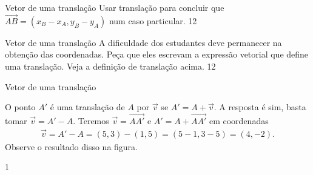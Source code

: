 \clearmargin
\begin{objectives}{Vetor de uma translação}
{
Usar translação para concluir que \(\overrightarrow{AB} = (x_B-x_A, y_B-y_A)\) num caso particular.
}{1}{2}
\end{objectives}
\begin{sugestions}{Vetor de uma translação}
{
A dificuldade dos estudantes deve permanecer na obtenção das coordenadas. Peça que eles escrevam a expressão vetorial que define uma translação. Veja a definição de translação acima.
}{1}{2}
\end{sugestions}
\begin{answer}{Vetor de uma translação}
{
O ponto \(A'\) é uma translação de \(A\) por \(\vec{v}\) se \(A' = A + \vec{v}\). A resposta é sim, basta tomar \(\vec{v} = A' - A\). Teremos \(\vec{v}=\overrightarrow{AA'}\) e \(A'=A + \overrightarrow{AA'}\) em coordenadas
\begin{equation*}
\begin{split}\overrightarrow{v} =A'- A = (5,3) - (1,5) = (5-1,3-5) = (4,-2).\end{split}
\end{equation*}
Observe o resultado disso na figura.

\begin{marginfigure}[H]
\centering
\capstart

\noindent{}
\caption{Trocar B por A’ na figura}\label{\detokenize{GE101-1A:id6}}\end{marginfigure}
}{1}
\end{answer}




